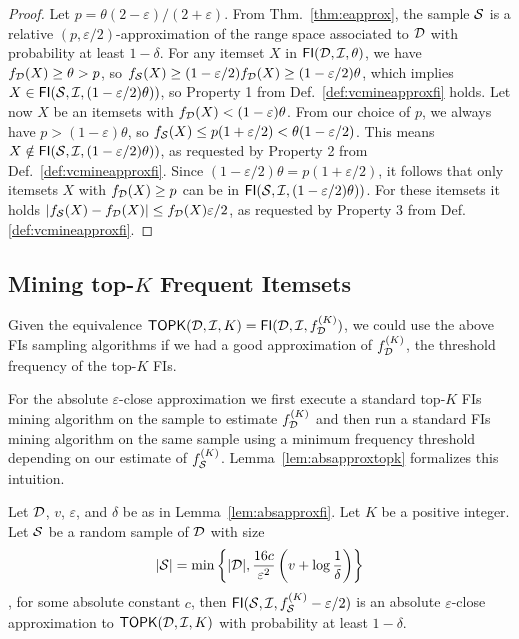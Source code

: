 \begin{proof}
  Let $p=\theta(2-\varepsilon)/(2+\varepsilon)$. From
  Thm.~\ref{thm:eapprox}, the sample ${\cal S}$ is a relative
  $(p,\varepsilon/2)$-approximation of the range space associated to ${\cal D}$ with
  probability at least $1-\delta$. For any itemset $X$ in
  $\mathsf{FI}({\cal D},{\cal I},\theta)$, we have $f_{\cal D}(X)\ge\theta>p$, so
  $f_{\cal S}(X)\ge (1-\varepsilon/2)f_{\cal D}(X)\ge(1-\varepsilon/2)\theta$, which
  implies $X\in\mathsf{FI}({\cal S},{\cal I},(1-\varepsilon/2)\theta))$, so Property 1
  from Def.~\ref{def:vcmineapproxfi} holds. Let now $X$ be an itemsets with
  $f_{\cal D}(X)< (1-\varepsilon)\theta$. From our choice of $p$, we always have
  $p>(1-\varepsilon)\theta$, so $f_{\cal S}(X)\le p(1+\varepsilon/2) <
  \theta(1-\varepsilon/2)$. This means
  $X\notin\mathsf{FI}({\cal S},{\cal I},(1-\varepsilon/2)\theta))$, as requested by
  Property 2 from Def.~\ref{def:vcmineapproxfi}. 
  Since $(1-\varepsilon/2)\theta=p(1+\varepsilon/2)$, it follows
  that only itemsets $X$ with $f_{\cal D}(X)\ge p$ can be in
  $\mathsf{FI}({\cal S},{\cal I},(1-\varepsilon/2)\theta))$. For these itemsets it holds
  $|f_{\cal S}(X)-f_{\cal D}(X)|\le f_{\cal D}(X)\varepsilon/2$, as requested by
  Property 3 from Def.\ref{def:vcmineapproxfi}.
\end{proof}

\subsection{Mining top-$K$ Frequent Itemsets}\label{sec:vcmineminingtopk}
Given the equivalence
$\mathsf{TOPK}({\cal D},{\cal I},K)=\mathsf{FI}({\cal D},{\cal I},f^{(K)}_{\cal D})$, we could use the above
FIs sampling algorithms if we had a good approximation of $f^{(K)}_{\cal D}$, the
threshold frequency of the top-$K$ FIs.

For the absolute $\varepsilon$-close approximation we first execute a standard
top-$K$ FIs mining algorithm on the sample to estimate $f^{(K)}_{\cal D}$ and then
run a standard FIs mining algorithm on the same sample using a minimum frequency
threshold depending on our estimate of $f_{\cal S}^{(K)}$.
Lemma~\ref{lem:absapproxtopk} formalizes this intuition.

\begin{lemma}\label{lem:absapproxtopk}
  Let ${\cal D}$, $v$, $\varepsilon$, and $\delta$ be as in Lemma~\ref{lem:absapproxfi}.
  Let $K$ be a positive integer. Let ${\cal S}$ be a random sample of ${\cal D}$ with
  size
  \[
  |{\cal S}|=\min\left\{|{\cal D}|,\frac{16c}{\varepsilon^2}\left(v+\log\frac{1}{\delta}\right)\right\}\],
  for some absolute constant $c$, then $\mathsf{FI}({\cal S},{\cal I},f_{\cal S}^{(K)}-\varepsilon/2)$ is an absolute
  $\varepsilon$-close approximation to $\mathsf{TOPK}({\cal D},{\cal I},K)$ with probability at
  least $1-\delta$.
\end{lemma}

